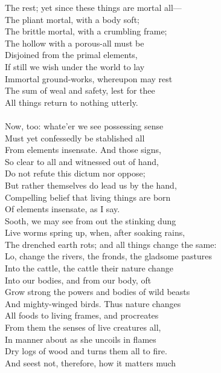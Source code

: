 The rest; yet since these things are mortal all—\\
The pliant mortal, with a body soft;\\
The brittle mortal, with a crumbling frame;\\
The hollow with a porous-all must be\\
Disjoined from the primal elements,\\
If still we wish under the world to lay\\
Immortal ground-works, whereupon may rest\\
The sum of weal and safety, lest for thee\\
All things return to nothing utterly.\\
\\
Now, too: whate'er we see possessing sense\\
Must yet confessedly be stablished all\\
From elements insensate. And those signs,\\
So clear to all and witnessed out of hand,\\
Do not refute this dictum nor oppose;\\
But rather themselves do lead us by the hand,\\
Compelling belief that living things are born\\
Of elements insensate, as I say.\\
Sooth, we may see from out the stinking dung\\
Live worms spring up, when, after soaking rains,\\
The drenched earth rots; and all things change the same:\\
Lo, change the rivers, the fronds, the gladsome pastures\\
Into the cattle, the cattle their nature change\\
Into our bodies, and from our body, oft\\
Grow strong the powers and bodies of wild beasts\\
And mighty-winged birds. Thus nature changes\\
All foods to living frames, and procreates\\
From them the senses of live creatures all,\\
In manner about as she uncoils in flames\\
Dry logs of wood and turns them all to fire.\\
And seest not, therefore, how it matters much\\

